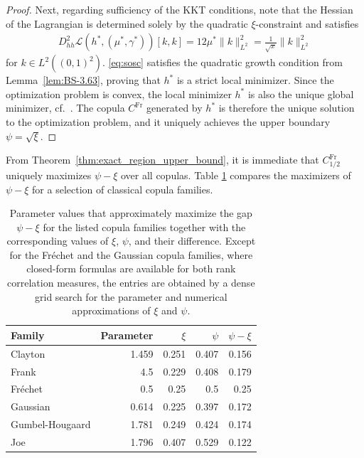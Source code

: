 \documentclass{article}
\newcommand{\1}{\mathds{1}}
\begin{document}
\begin{proof}
Next, regarding sufficiency of the KKT conditions, note that the Hessian of the Lagrangian is determined solely by the quadratic \(\xi\)-constraint and satisfies
\begin{align}\label{eq:sosc}
    D_{hh}^2 \mathcal{L}(h^*, (\mu^*,\gamma^*))[k,k]
    = 12\mu^* \|k\|_{L^2}^2
    = \frac{1}{\sqrt{x}} \|k\|_{L^2}^2
\end{align}
for $k\in L^2((0,1)^2)$.
\eqref{eq:sosc} satisfies the quadratic growth condition from Lemma~\ref{lem:BS-3.63}, proving that \(h^*\) is a strict local minimizer.
Since the optimization problem is convex, the local minimizer \(h^*\) is also the unique global minimizer, cf.~\cite[Lem.~4.6]{ansari2025exact}.
The copula \(C^{\text{Fr}}\) generated by \(h^*\) is therefore the unique solution to the optimization problem, and it uniquely achieves the upper boundary \(\psi = \sqrt{\xi}\).
\end{proof}

From Theorem~\ref{thm:exact_region_upper_bound}, it is immediate that $C^{\text{Fr}}_{1/2}$ uniquely maximizes $\psi-\xi$ over all copulas.
Table \ref{tab:footrule_minus_xi_max} compares the maximizers of $\psi-\xi$ for a selection of classical copula families.

\begin{table}[htbp]
  \centering
  \begin{tabular}{lrrrr}
    \toprule
    Family & Parameter & $\xi$ & $\psi$ & $\psi-\xi$ \\
    \midrule
    Clayton        &      1.459 &    0.251 &     0.407 &      0.156 \\
    Frank          &      4.5   &    0.229 &     0.408 &      0.179 \\
    Fréchet        &      0.5   &    0.25  &     0.5  &      0.25  \\
    Gaussian       &      0.614 &    0.225 &     0.397 &      0.172 \\
    Gumbel-Hougaard &      1.781 &    0.249 &     0.424 &      0.174 \\
    Joe            &      1.796 &    0.407 &     0.529 &      0.122 \\
    \bottomrule
  \end{tabular}
  \caption{
    Parameter values that approximately maximize the gap $\psi-\xi$ for the listed copula families together with the corresponding values of $\xi$, $\psi$, and their difference.
    Except for the Fréchet and the Gaussian copula families, where closed-form formulas are available for both rank correlation measures, the entries are obtained by a dense grid search for the parameter and numerical approximations of $\xi$ and $\psi$.
  }
  \label{tab:footrule_minus_xi_max}
\end{table}
\end{document}
